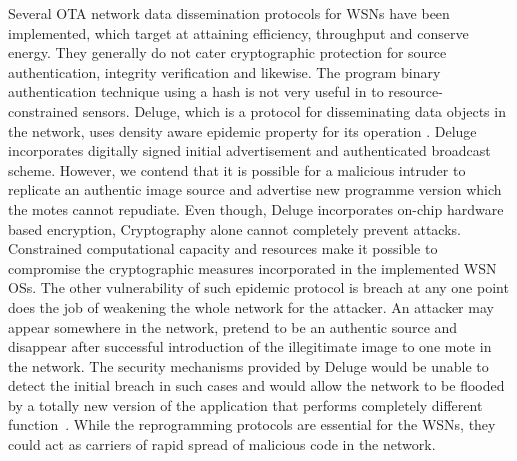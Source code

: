 \documentclass[conference,manuscript]{IEEEtran}
\begin{document}

Several OTA network data dissemination protocols for WSNs have been implemented, which target at attaining efficiency, throughput and conserve energy.
They generally do not cater cryptographic protection for source authentication, integrity verification and likewise. 
The program binary authentication technique using a hash is not very useful in to resource-constrained sensors. 
Deluge, which is a protocol for disseminating data objects in the network, uses density aware epidemic property for its operation \cite{1031506}. 
Deluge incorporates digitally signed initial advertisement  and authenticated broadcast scheme. 
However, we contend that it is possible for a malicious intruder to replicate an authentic image source and advertise new programme version which the motes cannot repudiate. 
Even though,  Deluge incorporates on-chip hardware based encryption,
Cryptography alone cannot completely prevent attacks. %
Constrained computational capacity and resources make it possible to compromise the cryptographic measures incorporated in the implemented WSN OSs.
The other vulnerability of such epidemic protocol is breach at any one point does the job of weakening the whole network for the attacker. 
An attacker may appear somewhere in the network, pretend to be an authentic source and disappear after successful introduction of the illegitimate image to one mote in the network. 
The security mechanisms provided by Deluge would be unable to detect the initial breach in such cases and would allow the network to be flooded by a totally new version of the application that performs completely different function~\cite{Karlof:2004:TLL:1031495.1031515}.
While the reprogramming protocols are essential for the WSNs, they could act as carriers of rapid spread of malicious code in the network.
\end{document}
